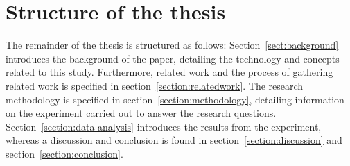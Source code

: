 
\section{Structure of the thesis}
The remainder of the thesis is structured as follows: Section~\ref{sect:background} introduces the background of the paper, detailing the technology and concepts related to this study. Furthermore, related work and the process of gathering related work is specified in section~\ref{section:relatedwork}. The research methodology is specified in section~\ref{section:methodology}, detailing information on the experiment carried out to answer the research questions. Section~\ref{section:data-analysis} introduces the results from the experiment, whereas a discussion and conclusion is found in section~\ref{section:discussion} and section~\ref{section:conclusion}.  

